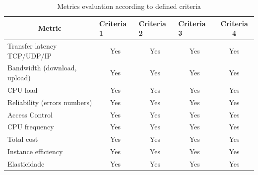 \documentclass[conference]{IEEEtran}
\begin{document}
\begin{table}[]
\centering
\caption{Metrics evaluation according to defined criteria}
\label{tab:avaliacao_metricas}
\begin{tabular}{@{}lcccc@{}}
\toprule
\multicolumn{1}{c}{\textbf{Metric}}              & \multicolumn{1}{l}{\textbf{Criteria 1}} & \multicolumn{1}{l}{\textbf{Criteria 2}} & \multicolumn{1}{l}{\textbf{Criteria 3}} & \textbf{Criteria 4}         \\ \midrule
Transfer latency TCP/UDP/IP                & Yes                                     & Yes                                     & Yes                                     & Yes                         \\
Bandwidth (download, upload)               & Yes                                     & Yes                                     & Yes                                     & Yes                         \\
CPU load                                      & Yes                                     & Yes                                     & Yes                                     & Yes                         \\
Reliability (errors numbers)                  & Yes                                     & Yes                                     & Yes                                     & Yes                         \\
Access Control                                & Yes                                     & Yes                                     & Yes                                     & Yes                         \\
CPU frequency                                 & Yes                                     & Yes                                     & Yes                                     & Yes                         \\
Total cost                                       & Yes                                     & Yes                                     & Yes                                     & Yes                         \\
Instance efficiency                           & Yes                                     & Yes                                     & Yes                                     & Yes                         \\
Elasticidade                                      & Yes                                     & Yes                                     & Yes                                     & Yes                         \\

\end{tabular}
\end{table}
\end{document}
